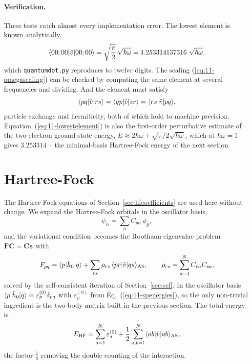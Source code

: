 \paragraph{Verification.}
Three tests catch almost every implementation error.  The lowest element is
known analytically,
\begin{equation}
  \langle 00;00 | \hat{v} | 00;00 \rangle
   = \sqrt{\frac{\pi}{2}}\,\sqrt{\hslash\omega}
   = 1.253314137316\ \sqrt{\hslash\omega},
  \label{eq:11-lowestelement}
\end{equation}
which \texttt{quantumdot.py} reproduces to twelve digits.  The scaling
(\ref{eq:11-omegascaling}) can be checked by computing the same element at
several frequencies and dividing.  And the element must satisfy
\begin{equation}
  \langle pq | \hat{v} | rs \rangle = \langle qp | \hat{v} | sr \rangle
   = \langle rs | \hat{v} | pq \rangle,
  \label{eq:11-symmetries}
\end{equation}
particle exchange and hermiticity, both of which hold to machine precision.
Equation~(\ref{eq:11-lowestelement}) is also the first-order perturbative
estimate of the two-electron ground-state energy,
$E\approx2\hbar\omega+\sqrt{\pi/2}\sqrt{\hbar\omega}$, which at
$\hbar\omega=1$ gives $3.253314$ -- the minimal-basis Hartree-Fock energy of
the next section.

\section{Hartree-Fock}
\label{sec:qdhf}

The Hartree-Fock equations of Section~\ref{sec:hfcoefficients} are used here
without change.  We expand the Hartree-Fock orbitals in the oscillator basis,
\begin{equation}
  \psi_{\alpha} = \sum_p C_{p\alpha}\,\phi_p ,
  \label{eq:11-expansion}
\end{equation}
and the variational condition becomes the Roothaan eigenvalue problem
$\bm{F}\bm{C}=\bm{C}\bm{\varepsilon}$ with
\begin{equation}
  F_{pq} = \langle p | \hat{h}_0 | q \rangle
    + \sum_{rs}\rho_{rs}\,\langle pr | \hat{v} | qs \rangle_{\mathrm{AS}},
  \qquad
  \rho_{rs} = \sum_{a=1}^{N}C_{ra}C_{sa} ,
  \label{eq:11-fock}
\end{equation}
solved by the self-consistent iteration of Section~\ref{sec:scf}.  In the
oscillator basis $\langle p | \hat{h}_0 | q \rangle=\varepsilon_p^{(0)}\delta_{pq}$
with $\varepsilon^{(0)}_p$ from Eq.~(\ref{eq:11-spenergies}), so the only
non-trivial ingredient is the two-body matrix built in the previous section.
The total energy is
\begin{equation}
  E_{\mathrm{HF}}
   = \sum_{a=1}^{N}\varepsilon^{(0)}_a
   + \frac12\sum_{a,b=1}^{N}\langle ab | \hat{v} | ab \rangle_{\mathrm{AS}} ,
  \label{eq:11-hfenergy}
\end{equation}
the factor $\tfrac12$ removing the double counting of the interaction.

